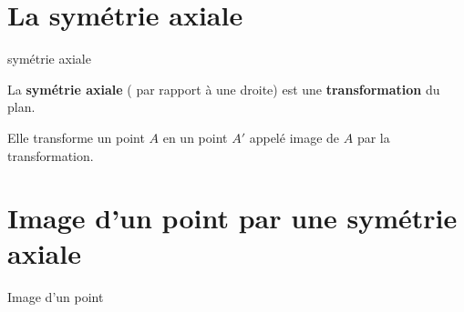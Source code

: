 \begin{pageCours}

\section{La symétrie axiale}

\begin{DefT}{symétrie axiale}

\begin{minipage}{0.65\linewidth}
La \textbf{symétrie axiale}  ( par rapport à une droite) est une \textbf{transformation} du plan.

Elle transforme un point $A$ en un point $A'$ appelé image de $A$ par la transformation.
\end{minipage}
\begin{minipage}{0.35\linewidth}
\end{minipage}
\end{DefT}
 

 

\section{Image d'un point par une symétrie axiale}

\begin{DefT}{Image d'un point} 


\end{DefT}
\end{pageCours}
